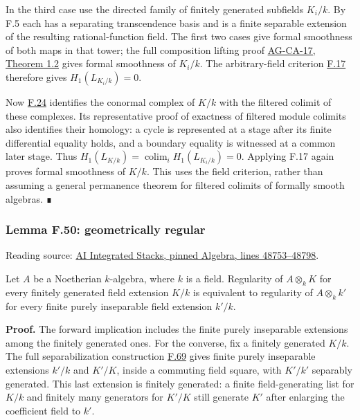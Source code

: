 \documentclass[11pt,a4paper,openany]{report}
\begin{document}
In the third case use the directed family of finitely generated subfields \(K_i/k\). By F.5 each has a separating transcendence basis and is a finite separable extension of the resulting rational-function field. The first two cases give formal smoothness of both maps in that tower; the full composition lifting proof \href{https://github.com/KokunoYumeto/open-math-courses/blob/d02d0a3669f42579db037cd44de1d113fdd770a1/docs/courses/AG-CA/src/formally-smooth-unramified-and-etale-ring-maps.md}{AG-CA-17, Theorem 1.2} gives formal smoothness of \(K_i/k\). The arbitrary-field criterion \hyperref[AG-RG-S05-algebra-lemma-characterize-formally-smooth-field-extension]{F.17} therefore gives \(H_1(L_{K_i/k})=0\).

Now \hyperref[AG-RG-S05-algebra-lemma-colimits-NL]{F.24} identifies the conormal complex of \(K/k\) with the filtered colimit of these complexes. Its representative proof of exactness of filtered module colimits also identifies their homology: a cycle is represented at a stage after its finite differential equality holds, and a boundary equality is witnessed at a common later stage. Thus \(H_1(L_{K/k})=\operatorname*{colim}_iH_1(L_{K_i/k})=0\). Applying F.17 again proves formal smoothness of \(K/k\). This uses the field criterion, rather than assuming a general permanence theorem for filtered colimits of formally smooth algebras. ∎

\label{AG-RG-S05-algebra-lemma-geometrically-regular}

\subsubsection{Lemma F.50: geometrically regular}\label{AG-RG-S05-lemma-f.50-geometrically-regular}

Reading source: \href{https://github.com/KokunoYumeto/unofficial-stacks-project-ai-drafts/blob/565b10e987aba5969b21145a0833f42d69f96790/algebra.tex\#L48753-L48798}{AI Integrated Stacks, pinned Algebra, lines 48753--48798}.

Let \(A\) be a Noetherian \(k\)-algebra, where \(k\) is a field. Regularity of \(A\otimes_kK\) for every finitely generated field extension \(K/k\) is equivalent to regularity of \(A\otimes_kk'\) for every finite purely inseparable field extension \(k'/k\).

\textbf{Proof.} The forward implication includes the finite purely inseparable extensions among the finitely generated ones. For the converse, fix a finitely generated \(K/k\). The full separabilization construction \hyperref[AG-RG-S05-algebra-lemma-make-separably-generated]{F.69} gives finite purely inseparable extensions \(k'/k\) and \(K'/K\), inside a commuting field square, with \(K'/k'\) separably generated. This last extension is finitely generated: a finite field-generating list for \(K/k\) and finitely many generators for \(K'/K\) still generate \(K'\) after enlarging the coefficient field to \(k'\).
\end{document}
